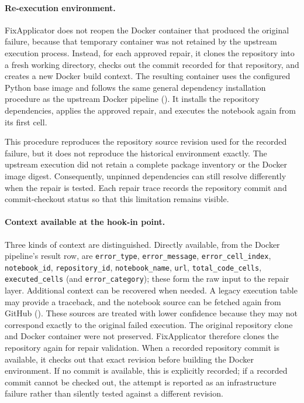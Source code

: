 \paragraph{Re-execution environment.}
FixApplicator does not reopen the Docker container that produced the original
failure, because that temporary container was not retained by the upstream
execution process. Instead, for each approved repair, it clones the repository
into a fresh working directory, checks out the commit recorded for that
repository, and creates a new Docker build context. The resulting container
uses the configured Python base image and follows the same general dependency
installation procedure as the upstream Docker pipeline
(). It installs the repository dependencies,
applies the approved repair, and executes the notebook again from its first
cell.

This procedure reproduces the repository source revision used for the recorded
failure, but it does not reproduce the historical environment exactly. The
upstream execution did not retain a complete package inventory or the Docker
image digest. Consequently, unpinned dependencies can still resolve
differently when the repair is tested. Each repair trace records the repository
commit and commit-checkout status so that this limitation remains visible.

\begin{sloppypar}
\paragraph{Context available at the hook-in point.}
Three kinds of context are distinguished. Directly available, from the
Docker pipeline's result row, are
\texttt{error\_type}, \texttt{error\_message}, \texttt{error\_cell\_index},
\texttt{notebook\_id}, \texttt{repository\_id}, \texttt{notebook\_name},
\texttt{url}, \texttt{total\_code\_cells}, \texttt{executed\_cells}
(and \texttt{error\_category}); these form the raw input to the repair
layer. Additional context can be recovered when needed. A legacy execution table
may provide a traceback, and the notebook source can be fetched again from
GitHub (). These sources are treated with lower
confidence because they may not correspond exactly to the original failed
execution. The original repository clone and Docker container were not
preserved. FixApplicator therefore clones the repository again for repair
validation. When a recorded repository commit is available, it checks out that
exact revision before building the Docker environment. If no commit is
available, this is explicitly recorded; if a recorded commit cannot be checked
out, the attempt is reported as an infrastructure failure rather than silently
tested against a different revision.
\end{sloppypar}

